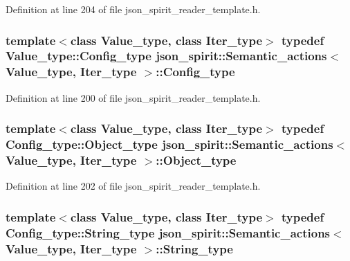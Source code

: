 Definition at line 204 of file json\+\_\+spirit\+\_\+reader\+\_\+template.\+h.

\hypertarget{classjson__spirit_1_1_semantic__actions_ac131d112e94a0861e12253a0dc5a7036}{}
\subsubsection[{Config\+\_\+type}]{\setlength{\rightskip}{0pt plus 5cm}template$<$class Value\+\_\+type, class Iter\+\_\+type$>$ typedef Value\+\_\+type\+::\+Config\+\_\+type {\bf json\+\_\+spirit\+::\+Semantic\+\_\+actions}$<$ {\bf Value\+\_\+type}, Iter\+\_\+type $>$\+::{\bf Config\+\_\+type}}\label{classjson__spirit_1_1_semantic__actions_ac131d112e94a0861e12253a0dc5a7036}


Definition at line 200 of file json\+\_\+spirit\+\_\+reader\+\_\+template.\+h.

\hypertarget{classjson__spirit_1_1_semantic__actions_a2a1b932809452028f780b706442bc69c}{}
\subsubsection[{Object\+\_\+type}]{\setlength{\rightskip}{0pt plus 5cm}template$<$class Value\+\_\+type, class Iter\+\_\+type$>$ typedef Config\+\_\+type\+::\+Object\+\_\+type {\bf json\+\_\+spirit\+::\+Semantic\+\_\+actions}$<$ {\bf Value\+\_\+type}, Iter\+\_\+type $>$\+::{\bf Object\+\_\+type}}\label{classjson__spirit_1_1_semantic__actions_a2a1b932809452028f780b706442bc69c}


Definition at line 202 of file json\+\_\+spirit\+\_\+reader\+\_\+template.\+h.

\hypertarget{classjson__spirit_1_1_semantic__actions_a3e726d04ba8bf36d2b1a16d7243f771c}{}
\subsubsection[{String\+\_\+type}]{\setlength{\rightskip}{0pt plus 5cm}template$<$class Value\+\_\+type, class Iter\+\_\+type$>$ typedef Config\+\_\+type\+::\+String\+\_\+type {\bf json\+\_\+spirit\+::\+Semantic\+\_\+actions}$<$ {\bf Value\+\_\+type}, Iter\+\_\+type $>$\+::{\bf String\+\_\+type}}\label{classjson__spirit_1_1_semantic__actions_a3e726d04ba8bf36d2b1a16d7243f771c}


